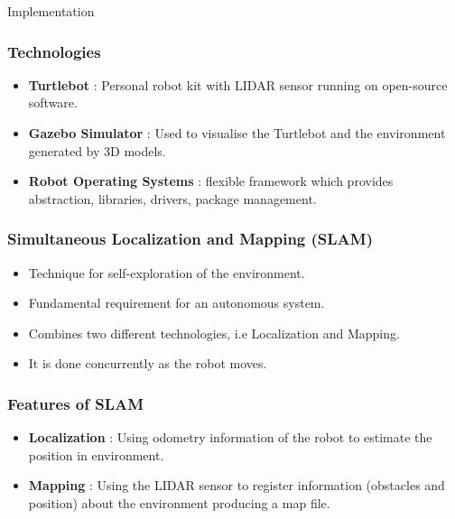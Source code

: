 \documentclass{beamer}
\begin{document}
\begin{frame}
    \Huge{\centerline{Implementation}}
\end{frame}

\begin{frame}
    \frametitle{Technologies}
    \begin{itemize}
        \item \textbf{Turtlebot} : Personal robot kit with LIDAR sensor running on open-source software.
        \item \textbf{Gazebo Simulator} \cite{p3} : Used to visualise the Turtlebot and the environment generated by 3D models.
        \item \textbf{Robot Operating Systems} : flexible framework which provides abstraction, libraries, drivers, package management.
    \end{itemize}
\end{frame}

\begin{frame}
    \frametitle{Simultaneous Localization and Mapping (SLAM)}
    \begin{itemize}
        \item Technique for self-exploration of the environment.
        \item Fundamental requirement for an autonomous system.
        \item Combines two different technologies, i.e Localization and Mapping.
        \item It is done concurrently as the robot moves.
    \end{itemize}
\end{frame}

\begin{frame}
    \frametitle{Features of SLAM}
    \begin{itemize}
        \item \textbf{Localization} : Using odometry information of the robot to estimate the position in environment.
        \item \textbf{Mapping} : Using the LIDAR sensor to register information (obstacles and position) about the environment producing a map file.
    \end{itemize}
\end{frame}
\end{document}

